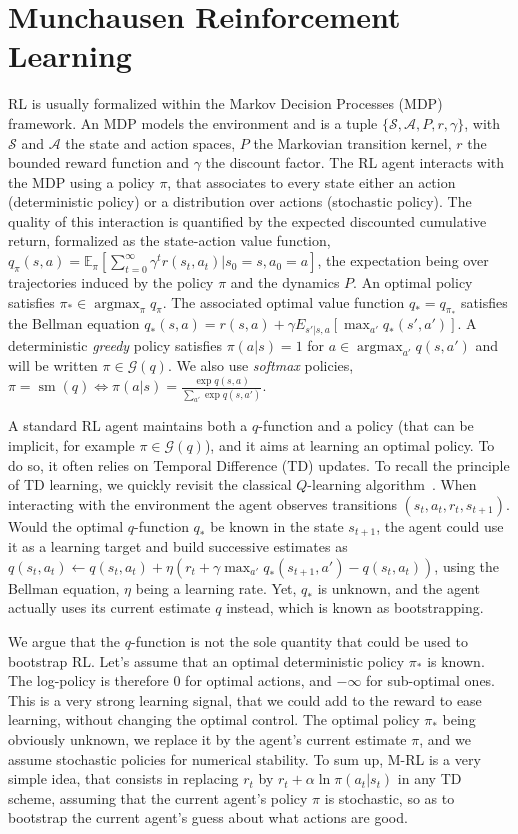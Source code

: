 \documentclass{article}
\newcommand{\gr}{\mathcal{G}}
\DeclareMathOperator*{\argmax}{argmax}
\DeclareMathOperator*{\softmax}{sm}
\newcommand{\states}{\mathcal{S}}
\newcommand{\actions}{\mathcal{A}}
\begin{document}
\section{Munchausen Reinforcement Learning \label{sec:mrl}}

RL is usually formalized within the Markov Decision Processes (MDP) framework. An MDP models the environment and is a tuple $\{\states, \actions, P, r, \gamma\}$, with $\states$ and $\actions$ the state and action spaces, $P$ the Markovian transition kernel, $r$ the bounded reward function and $\gamma$ the discount factor.  The RL agent interacts with the MDP using a policy $\pi$, that associates to every state either an action (deterministic policy) or a distribution over actions (stochastic policy). The quality of this interaction is quantified by the expected discounted cumulative return, formalized as the state-action value function, $q_\pi(s,a) = \mathbb{E}_\pi[\sum_{t=0}^\infty \gamma^t r(s_t, a_t) | s_0=s, a_0 = a]$, the expectation being over trajectories induced by the policy $\pi$ and the dynamics $P$. An optimal policy satisfies $\pi_*\in\argmax_{\pi} q_\pi$. The associated optimal value function $q_* = q_{\pi_*}$ satisfies the Bellman equation $q_*(s,a) = r(s,a) + \gamma E_{s'|s,a}[\max_{a'}q_*(s',a')]$. A deterministic \textit{greedy} policy satisfies $\pi(a|s)=1$ for $a\in\argmax_{a'}q(s,a')$
and will be written $\pi\in\gr(q)$. We also use \textit{softmax} policies, $\pi=\softmax(q) \Leftrightarrow \pi(a|s) = \frac{\exp q(s,a)}{\sum_{a'} \exp q(s,a')}$.

A standard RL agent maintains both a $q$-function and a policy (that can be implicit, for example $\pi\in\gr(q)$), and it aims at learning an optimal policy. To do so, it often relies on Temporal Difference (TD) updates. To recall the principle of TD learning, we quickly revisit the classical $Q$-learning algorithm~\cite{watkins1992q}. When interacting with the environment the agent observes transitions $(s_t,a_t,r_t,s_{t+1})$. Would the optimal $q$-function $q_*$ be known in the state $s_{t+1}$, the agent could use it as a learning target and build successive estimates as $q(s_t,a_t) \leftarrow q(s_t,a_t) + \eta (r_t + \gamma \max_{a'} q_*(s_{t+1},a') - q(s_t,a_t))$, using the Bellman equation, $\eta$ being a learning rate. Yet, $q_*$ is unknown, and the agent actually uses its current estimate $q$ instead, which is known as bootstrapping. 

We argue that the $q$-function is not the sole quantity that could be used to bootstrap RL. Let's assume that an optimal deterministic policy $\pi_*$ is known. The log-policy is therefore $0$ for optimal actions, and $-\infty$ for sub-optimal ones. This is a very strong learning signal, that we could add to the reward to ease learning, without changing the optimal control. The optimal policy $\pi_*$ being obviously unknown, we replace it by the agent's current estimate $\pi$, and we assume stochastic policies for numerical stability. To sum up, M-RL is a very simple idea, that consists in replacing $r_t$ by $r_t+\alpha \ln \pi(a_t|s_t)$ in any TD scheme, assuming that the current agent's policy $\pi$ is stochastic, so as to bootstrap the current agent's guess about what actions are good.
\end{document}
